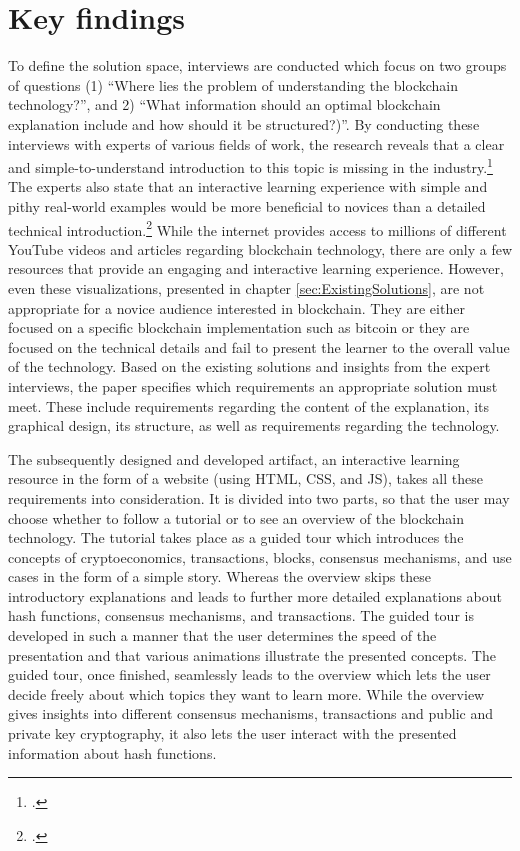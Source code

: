 \section{Key findings}
To define the solution space, interviews are conducted which focus on two groups of questions (1) \enquote{Where lies the problem of understanding the blockchain technology?}, and 2) \enquote{What information should an optimal blockchain explanation include and how should it be structured?)}.
By conducting these interviews with experts of various fields of work, the research reveals that a clear and simple-to-understand introduction to this topic is missing in the industry.\footcite[Cf.][]{DanielKaltenbach_Interview} The experts also state that an interactive learning experience with simple and pithy real-world examples would be more beneficial to novices than a detailed technical introduction.\footcite[Cf.][]{BjoernPaulewicz_Interview} While the internet provides access to millions of different YouTube videos and articles regarding blockchain technology, there are only a few resources that provide an engaging and interactive learning experience. However, even these visualizations, presented in chapter \ref{sec:ExistingSolutions}, are not appropriate for a novice audience interested in blockchain.  They are either focused on a specific blockchain implementation such as bitcoin or they are focused on the technical details and fail to present the learner to the overall value of the technology. Based on the existing solutions and insights from the expert interviews, the paper specifies which requirements an appropriate solution must meet. These include requirements regarding the content of the explanation, its graphical design, its structure, as well as requirements regarding the technology.

The subsequently designed and developed artifact, an interactive learning resource in the form of a website (using \ac{HTML}, \ac{CSS}, and \ac{JS}), takes all these requirements into consideration. It is divided into two parts, so that the user may choose whether to follow a tutorial or to see an overview of the blockchain technology. The tutorial takes place as a guided tour which introduces the concepts of cryptoeconomics, transactions, blocks, consensus mechanisms, and use cases in the form of a simple story. Whereas the overview skips these introductory explanations and leads to further more detailed explanations about hash functions, consensus mechanisms, and transactions. The guided tour is developed in such a manner that the user determines the speed of the presentation and that various animations illustrate the presented concepts. The guided tour, once finished, seamlessly leads to the overview which lets the user decide freely about which topics they want to learn more. While the overview gives insights into different consensus mechanisms, transactions and public and private key cryptography, it also lets the user interact with the presented information about hash functions.

